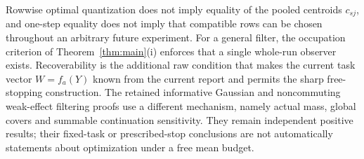 Rowwise optimal quantization does not imply equality of the pooled centroids $c_{sj}$, and one-step equality does not imply that compatible rows can be chosen throughout an arbitrary future experiment. For a general filter, the occupation criterion of Theorem~\ref{thm:main}(i) enforces that a single whole-run observer exists. Recoverability is the additional raw condition that makes the current task vector $W=f_a(Y)$ known from the current report and permits the sharp free-stopping construction. The retained informative Gaussian and noncommuting weak-effect filtering proofs use a different mechanism, namely actual mass, global covers and summable continuation sensitivity. They remain independent positive results; their fixed-task or prescribed-stop conclusions are not automatically statements about optimization under a free mean budget.
